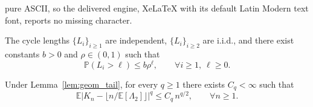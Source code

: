 \documentclass[10pt,a4paper]{amsart}
\def\E{\mathbb{E}}%
\begin{document}
pure ASCII, so the delivered engine, XeLaTeX with its default Latin Modern text font, reports no missing character.
\begin{lemma}\label{lem:geom_tail}
The cycle lengths \(\{L_i\}_{i\ge 1}\) are independent, \(\{L_i\}_{i\ge 2}\) are i.i.d., and there exist constants \(b>0\) and \(\rho\in(0,1)\) such that
\[
\mathbb P(L_i>\ell)\le b\rho^\ell,
\qquad \forall i\ge 1,\ \ell\ge 0.
\]
\end{lemma}

\begin{lemma}\label{lem:K}
Under Lemma~\ref{lem:geom_tail}, for every \(q\ge 1\) there exists
\(C_q<\infty\) such that
\[
\E\bigl|K_n-\lfloor n/\E[\Lambda_2] \rfloor\bigr|^{q}
\le C_q\, n^{q/2},
\qquad \forall n\ge 1.
\]
\end{lemma}
\end{document}
